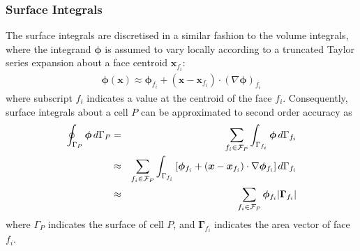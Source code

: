 \documentclass[sn-mathphys,Numbered]{sn-jnl}%
\newcommand{\bb}{\boldsymbol}
\begin{document}
\subsubsection{Surface Integrals}
The surface integrals are discretised in a similar fashion to the volume integrals, where the integrand $\bb{\phi}$ is assumed to vary locally according to a truncated Taylor series expansion about a face centroid $\bb{x}_{f_i}$:
\begin{eqnarray}
	\bb{\phi}(\bb{x})  \approx \bb{\phi}_{f_i} + (\bb{x} - \bb{x}_{f_i}) \cdot \left(\nabla \bb{\phi} \right)_{f_i}
\end{eqnarray}
where subscript $f_i$ indicates a value at the centroid of the face $f_i$.
Consequently, surface integrals about a cell $P$ can be approximated to second order accuracy as
\begin{eqnarray} \label{eq:surface_integral}
	\oint_{\Gamma_P} \bb{\phi} \, d \Gamma_P
		&=& \sum_{f_i \in \mathcal{F}_P} \int_{\Gamma_{f_i}} \bb{\phi} \,  d \Gamma_{f_i} \notag \\
		&\approx& \sum_{f_i \in \mathcal{F}_P} \int_{\Gamma_{f_i}}  \left[ \bb{\phi}_{f_i} + (\bb{x} - \bb{x}_{f_i}) \cdot \nabla \bb{\phi}_{f_i} \right] d \Gamma_{f_i} \notag \\
		&\approx& \sum_{f_i \in \mathcal{F}_P} \bb{\phi}_{f_i} |\bb{\Gamma}_{f_i} |
\end{eqnarray}
where $\Gamma_P$ indicates the surface of cell $P$, and $\bb{\Gamma}_{f_i}$ indicates the area vector of face $f_i$.
\end{document}
